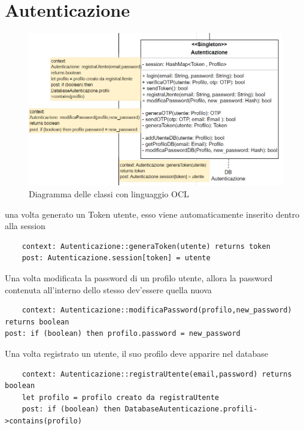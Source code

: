 \documentclass{report}
\begin{document}
\section{Autenticazione}
\begin{figure}[H]
	\centering\includegraphics[width=1\textwidth]{images/OCL/OCL_Autenticazione.PNG}
	Diagramma delle classi con linguaggio OCL 
\end{figure}
una volta generato un Token utente, esso viene automaticamente inserito dentro alla session
\begin{verbatim}
	context: Autenticazione::generaToken(utente) returns token
	post: Autenticazione.session[token] = utente

\end{verbatim}
Una volta modificata la password di un profilo utente, allora la password contenuta all'interno dello stesso dev'essere quella nuova
\begin{verbatim}
	context: Autenticazione::modificaPassword(profilo,new_password) returns boolean
post: if (boolean) then profilo.password = new_password

\end{verbatim}
Una volta registrato un utente, il suo profilo deve apparire nel database
\begin{verbatim}
	context: Autenticazione::registraUtente(email,password) returns boolean
	let profilo = profilo creato da registraUtente
	post: if (boolean) then DatabaseAutenticazione.profili->contains(profilo)

\end{verbatim}
\end{document}
